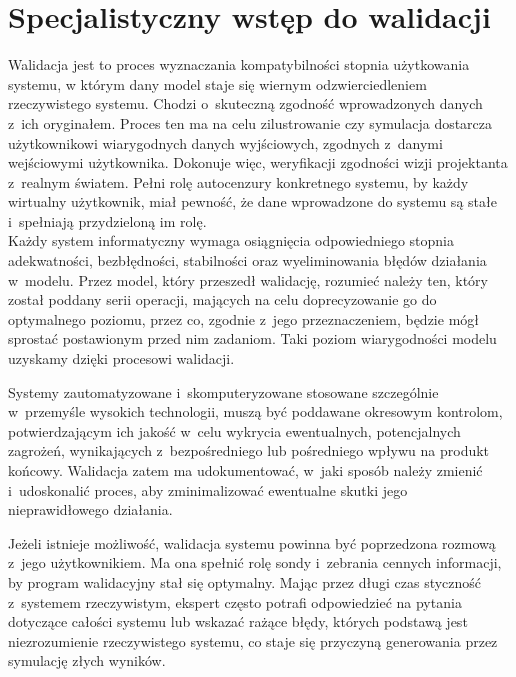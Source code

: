 \documentclass[brudnopis]{xmgr}
\begin{document}
\section{Specjalistyczny wstęp do walidacji}

\indent \indent \indent \textcolor{sb}{Walidacja jest to proces wyznaczania kompatybilności stopnia użytkowania systemu,} \textcolor{sa}{w którym dany model staje się wiernym odzwierciedleniem rzeczywistego systemu.} \textcolor{sb}{Chodzi o~skuteczną zgodność wprowadzonych danych z~ich oryginałem.} \textcolor{sa}{Proces ten ma na celu zilustrowanie czy symulacja dostarcza użytkownikowi wiarygodnych danych wyjściowych, zgodnych z~danymi wejściowymi użytkownika. Dokonuje więc, weryfikacji zgodności wizji projektanta z~realnym światem. Pełni rolę autocenzury konkretnego systemu, by każdy wirtualny użytkownik, miał pewność, że dane wprowadzone do systemu są stałe i~spełniają przydzieloną im rolę.}
\\
\indent \textcolor{sb}{Każdy system informatyczny wymaga osiągnięcia odpowiedniego stopnia adekwatności, bezbłędności, stabilności oraz wyeliminowania błędów działania w~modelu}. \textcolor{sa}{Przez model, który przeszedł walidację, rozumieć należy ten, który został poddany serii operacji,} \textcolor{sa}{mających na celu doprecyzowanie go do optymalnego poziomu, przez co, zgodnie z~jego przeznaczeniem, będzie mógł sprostać postawionym przed nim zadaniom. Taki poziom wiarygodności modelu uzyskamy dzięki procesowi walidacji.}

\textcolor{sb}{Systemy zautomatyzowane i~skomputeryzowane stosowane szczególnie w~przemyśle wysokich technologii, muszą być poddawane okresowym kontrolom,} \textcolor{sa}{potwierdzającym ich jakość w~celu wykrycia ewentualnych, potencjalnych zagrożeń, wynikających z~bezpośredniego lub pośredniego wpływu na produkt końcowy. Walidacja zatem ma udokumentować, w~jaki sposób należy zmienić i~udoskonalić proces, aby zminimalizować ewentualne skutki jego nieprawidłowego działania.}

\textcolor{sb}{Jeżeli istnieje możliwość, walidacja systemu powinna być poprzedzona rozmową z~jego użytkownikiem.} \textcolor{sa}{Ma ona spełnić rolę sondy i~zebrania cennych informacji, by program walidacyjny stał się optymalny.} \textcolor{sb}{Mając przez długi czas styczność z~systemem rzeczywistym, ekspert często potrafi odpowiedzieć na pytania dotyczące całości systemu lub wskazać rażące błędy,} \textcolor{sa}{których podstawą jest niezrozumienie rzeczywistego systemu, co staje się przyczyną generowania przez symulację złych wyników.} \cite{Validation}
\end{document}
